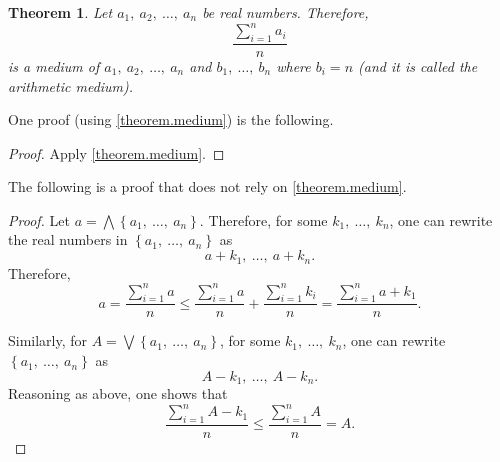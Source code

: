 \documentclass[11pt,oneside]{book}
\newtheorem{theorem}{Theorem}[chapter]
\theoremstyle{definition}
\theoremstyle{remark}
\begin{document}
\begin{theorem}
    Let $a_1,\ a_2,\ \dots,\ a_n$ be real numbers. Therefore, 
    \[
        \frac{\sum_{i=1}^{n}a_i}{n}
    \]
    is a medium of $a_1,\ a_2,\ \dots,\ a_n$ and $b_1,\ \dots,\ b_n$ where $b_i = n$ (and it is called the \textit{arithmetic medium}).
\end{theorem}
One proof (using \cref{theorem.medium}) is the following.
\begin{proof}
    Apply \cref{theorem.medium}.
\end{proof}

The following is a proof that does not rely on \cref{theorem.medium}.
\begin{proof}
    Let $a = \bigwedge\left\{a_1,\ \dots,\ a_n\right\}$.
Therefore, for some $k_1,\ \dots,\ k_n$, one can rewrite the real numbers in $\left\{a_1,\ \dots,\ a_n\right\}$ as 
\[
    a+k_1,\ \dots,\ a+k_n.
\]
Therefore, 
\[
    a = \frac{\sum_{i=1}^{n} a}{n} \leq \frac{\sum_{i=1}^{n} a}{n} + \frac{\sum_{i=1}^{n} k_i}{n} = \frac{\sum_{i=1}^{n} a+k_1}{n}.
\]

Similarly, for $A = \bigvee \left\{a_1,\ \dots,\ a_n\right\}$, for some $k_1,\ \dots,\ k_n$, one can rewrite $\left\{a_1,\ \dots,\ a_n\right\}$ as 
\[
    A-k_1,\ \dots,\ A-k_n.
\]
Reasoning as above, one shows that 
\[
    \frac{\sum_{i=1}^{n} A-k_1}{n} \leq \frac{\sum_{i=1}^{n} A}{n} = A.
\]
\end{proof}



% 
% 
\end{document}
